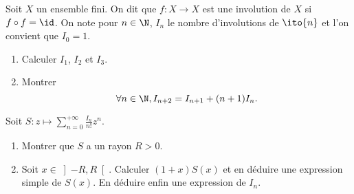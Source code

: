 \begin{enonce}
\begin{exercise}[ID={RMS126 E780},subtitle={Centrale PSI 2015},tags={}]
Soit $X$ un ensemble fini.
On dit que $f:X\to X$ est une involution de $X$ si $f\circ f=\id$.
On note pour $n\in\N$, $I_n$ le nombre d'involutions de $\ito{n}$ et l'on convient que $I_0=1$.
\begin{enumerate}
  \item 
    Calculer $I_1$, $I_2$ et $I_3$.

  \item
    Montrer
    \begin{equation*}
      \forall n\in\N, I_{n+2} = I_{n+1} + (n+1) I_n.
    \end{equation*}
\end{enumerate}
Soit $S:z\mapsto\sum_{n=0}^{+\infty} \frac{I_n}{n!}z^n$.
\begin{enumerate}[resume]
  \item 
    Montrer que $S$ a un rayon $R > 0$.

  \item 
    Soit $x\in\left]-R, R\right[$.
    Calculer $(1+x)S(x)$ et en déduire une expression simple de $S(x)$.
    En déduire enfin une expression de $I_n$.
\end{enumerate}
\end{exercise}
\begin{solution}
\end{solution}
\end{enonce}
